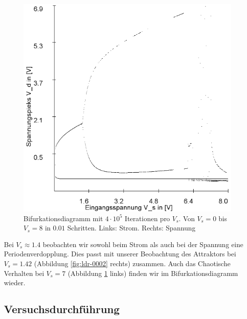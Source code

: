 \documentclass[12pt,a4paper]{article}
\begin{document}
\begin{figure}[!htbp]
\includegraphics[scale=0.4]{schwing-bifurc-von-0-8-in-0,01schritten-400k-spannung}
\caption{Bifurkationsdiagramm mit $4\cdot10^5$ Iterationen pro $V_s$. Von $V_s=0$ bis $V_s=8$ in $0.01$ Schritten. Links: Strom. Rechts: Spannung}
\label{fig:ldr-bifurc}
\end{figure}
Bei $V_s\approx1.4$ beobachten wir sowohl beim Strom als auch bei der Spannung eine Periodenverdopplung. Dies passt mit unserer Beobachtung des Attraktors bei $V_s=1.42$ (Abbildung \ref{fig:ldr-0002} rechts) zusammen. Auch das Chaotische Verhalten bei $V_s=7$ (Abbildung \ref{fig:ldr-bifurc} links) finden wir im Bifurkationsdiagramm wieder.
\subsection { Versuchsdurchführung }
\end{document}
